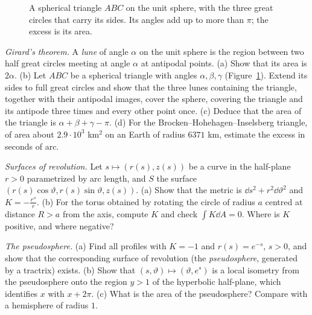 \begin{figure}[ht]
\centering
{}
\caption{A spherical triangle $ABC$ on the unit sphere, with the three great circles that carry its sides. Its angles add up to more than $\pi$; the excess is its area.}
\label{fig:girard}
\end{figure}

\begin{exercise}[$\star$]\label{ex:girard}
\emph{Girard's theorem.} A \emph{lune} of angle $\alpha$ on the unit sphere is the region between two half great circles meeting at angle $\alpha$ at antipodal points. (a) Show that
its area is $2\alpha$. (b) Let $ABC$ be a spherical triangle with angles $\alpha,\beta,\gamma$ (Figure~\ref{fig:girard}). Extend its sides to full great circles and show that the three
lunes containing the triangle, together with their antipodal images, cover the sphere, covering the triangle and its antipode three times and every other point
once. (c) Deduce that the area of the triangle is $\alpha+\beta+\gamma-\pi$. (d) For the Brocken--Hohehagen--Inselsberg triangle, of area about $2.9\cdot10^3$ km$^2$ on an Earth of radius
$6371$ km, estimate the excess in seconds of arc.
\end{exercise}

\begin{exercise}[$\star$]\label{ex:revolution}
\emph{Surfaces of revolution.} Let $s\mapsto(r(s),z(s))$ be a curve in the half-plane $r>0$ parametrized by arc length, and $S$ the surface
$(r(s)\cos\vartheta,r(s)\sin\vartheta,z(s))$. (a) Show that the metric is $\dd s^2+r^2\dd\vartheta^2$ and $K=-\frac{r''}r$. (b) For the torus obtained by rotating the circle of radius $a$
centred at distance $R>a$ from the axis, compute $K$ and check $\int K\dd A=0$. Where is $K$ positive, and where negative?
\end{exercise}

\begin{exercise}[$\star\star$]\label{ex:pseudosphere}
\emph{The pseudosphere.} (a) Find all profiles with $K=-1$ and $r(s)=e^{-s}$, $s>0$, and show that the corresponding surface of revolution (the \emph{pseudosphere}, generated by a
tractrix) exists. (b) Show that $(s,\vartheta)\mapsto(\vartheta,e^s)$ is a local isometry from the pseudosphere onto the region $y>1$ of the hyperbolic half-plane, which identifies $x$ with $x+2\pi$.
(c) What is the area of the pseudosphere? Compare with a hemisphere of radius $1$.
\end{exercise}

